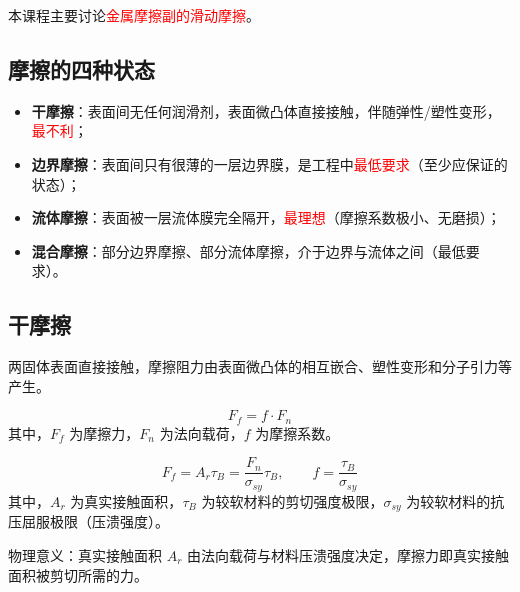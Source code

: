 \begin{note}
本课程主要讨论\textcolor{red}{金属摩擦副的滑动摩擦}。
\end{note}

\subsection{摩擦的四种状态}

\begin{definition}
\label{def:摩擦四种状态}
\begin{itemize}
	\item \textbf{干摩擦}：表面间无任何润滑剂，表面微凸体直接接触，伴随弹性/塑性变形，\textcolor{red}{最不利}；
	\item \textbf{边界摩擦}：表面间只有很薄的一层边界膜，是工程中\textcolor{red}{最低要求}（至少应保证的状态）；
	\item \textbf{流体摩擦}：表面被一层流体膜完全隔开，\textcolor{red}{最理想}（摩擦系数极小、无磨损）；
	\item \textbf{混合摩擦}：部分边界摩擦、部分流体摩擦，介于边界与流体之间（最低要求）。
\end{itemize}
\end{definition}

\subsection{干摩擦}

两固体表面直接接触，摩擦阻力由表面微凸体的相互嵌合、塑性变形和分子引力等产生。

\begin{theorem}
\label{thm:库仑公式}
\begin{equation}
	F_f=f\cdot F_n
	\label{eq:摩擦:库仑公式}
\end{equation}
其中，$F_f$ 为摩擦力，$F_n$ 为法向载荷，$f$ 为摩擦系数。
\end{theorem}

\begin{theorem}[简单粘着理论]
\label{thm:简单粘着理论}
\begin{equation}
	F_f=A_r\tau_B=\frac{F_n}{\sigma_{sy}}\tau_B,\qquad f=\frac{\tau_B}{\sigma_{sy}}
	\label{eq:摩擦:简单粘着理论}
\end{equation}
其中，$A_r$ 为真实接触面积，$\tau_B$ 为较软材料的剪切强度极限，$\sigma_{sy}$ 为较软材料的抗压屈服极限（压溃强度）。

物理意义：真实接触面积 $A_r$ 由法向载荷与材料压溃强度决定，摩擦力即真实接触面积被剪切所需的力。
\end{theorem}

